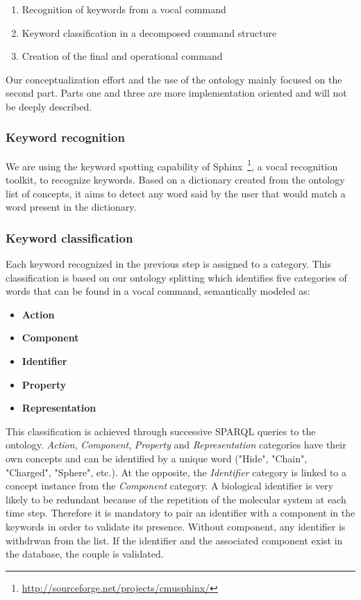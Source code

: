 \documentclass{vgtc}                          %
\begin{document}
\begin{enumerate}
  \item Recognition of keywords from a vocal command
  \item Keyword classification in a decomposed command structure
  \item Creation of the final and operational command
\end{enumerate}

Our conceptualization effort and the use of the ontology mainly focused on the second part. Parts one and three are more implementation oriented and will not be deeply described.

\subsubsection{Keyword recognition}

We are using the keyword spotting capability of Sphinx~\footnote{\url{http://sourceforge.net/projects/cmusphinx/}}, a vocal recognition toolkit, to recognize keywords. Based on a dictionary created from the ontology list of concepts, it aims to detect any word said by the user that would match a word present in the dictionary.

\subsubsection{Keyword classification}

Each keyword recognized in the previous step is assigned to a category. This classification is based on our ontology splitting which identifies five categories of words that can be found in a vocal command, semantically modeled as:

\begin{itemize}
  \item \textbf{Action}
  \item \textbf{Component}
  \item \textbf{Identifier}
  \item \textbf{Property}
  \item \textbf{Representation}
\end{itemize}

This classification is achieved through successive SPARQL queries to the ontology. \textit{Action}, \textit{Component}, \textit{Property} and \textit{Representation} categories have their own concepts and can be identified by a unique word ("Hide", "Chain", "Charged", "Sphere", etc.). At the opposite, the \textit{Identifier} category is linked to a concept instance from the \textit{Component} category. A biological identifier is very likely to be redundant because of the repetition of the molecular system at each time step. 
Therefore it is mandatory to pair an identifier with a component in the keywords in order to validate its presence. Without component, any identifier is withdrwan from the list. If the identifier and the associated component exist in the database, the couple is validated.
\end{document}
